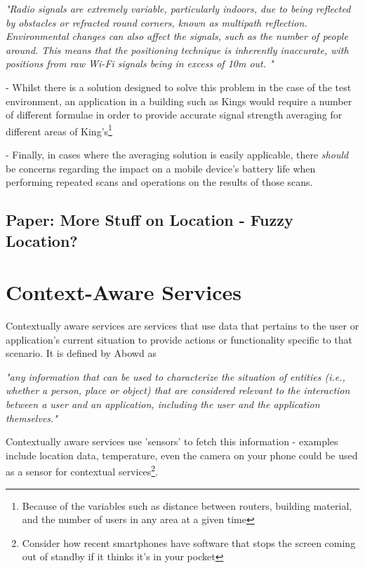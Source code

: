\documentclass[11pt]{informatics-report}
\begin{document}
\textit{"Radio signals are extremely variable, particularly indoors, due to being reflected by obstacles or refracted round corners, known as multipath reflection. Environmental changes can also affect the signals, such as the number of people around. This means that the positioning technique is inherently inaccurate, with positions from raw Wi-Fi signals being in excess of 10m out. "}\cite{cook2005indoor}

\noindent- Whilst there is a solution designed to solve this problem in the case of the test environment, an application in a building such as Kings would require a number of different formulae in order to provide accurate signal strength averaging for different areas of King's\footnote{ Because of the variables such as distance between routers, building material, and the number of users in any area at a given time}

\noindent- Finally, in cases where the averaging solution is easily applicable, there \textit{should} be concerns regarding the impact on a mobile device's battery life when performing repeated scans and operations on the results of those scans.

\subsection{Paper: More Stuff on Location - Fuzzy Location?} 

\section{Context-Aware Services}

Contextually aware services are services that use data that pertains to the user or application's current situation to provide actions or functionality specific to that scenario. It is defined by Abowd as 

\textit{ "any information that can be used to characterize the situation of entities (i.e., whether a person, place or object) that are considered relevant to the interaction between a user and an application, including the user and the application themselves." }\cite{abowd1999towards}

Contextually aware services use 'sensors' to fetch this information - examples include location data, temperature, even the camera on your phone could be used as a sensor for contextual services\footnote{Consider how recent smartphones have software that stops the screen coming out of standby if it thinks it's in your pocket}.
\end{document}
